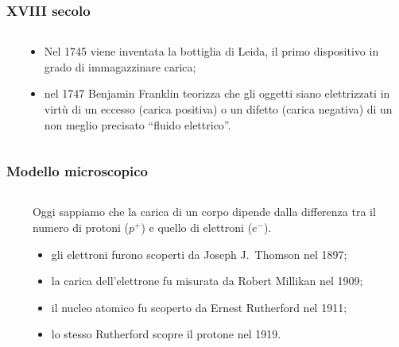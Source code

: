 \documentclass[]{beamer}
\theoremstyle{plain}
\begin{document}
\begin{frame}
\frametitle{XVIII secolo}
\begin{columns}
\begin{column}{0.2\textwidth}
~
\end{column}
\begin{column}{0.7\textwidth}
\begin{itemize}
\item<1-> Nel 1745 viene inventata la \alert<1>{bottiglia di Leida}, il primo dispositivo in grado di immagazzinare carica;\pause
\item<2-> nel 1747 Benjamin Franklin teorizza che gli oggetti siano elettrizzati in virtù di un eccesso (\alert<2>{carica positiva}) o un difetto (\alert<2>{carica negativa}) di un non meglio precisato ``fluido elettrico''.
\end{itemize}
\end{column}
\end{columns}
\end{frame}





\begin{frame}
\frametitle{Modello microscopico}
\begin{columns}
\begin{column}{0.2\textwidth}
~
~
\end{column}
\begin{column}{0.7\textwidth}
Oggi sappiamo che la \alert<1>{carica di un corpo dipende dalla differenza tra il numero di protoni ($ p^{+} $) e quello di elettroni ($ e^{-} $)}.
\begin{itemize}
\item<2-> gli elettroni furono scoperti da Joseph J.~\alert<2>{Thomson} nel \alert<2>{1897};
\item<3-> la carica dell'elettrone fu misurata da Robert \alert<3>{Millikan} nel \alert<3>{1909};
\item<4-> il nucleo atomico fu scoperto da Ernest \alert<4->{Rutherford} nel \alert<4>{1911};
\item<5-> lo stesso Rutherford scopre il protone nel \alert<5>{1919}.
\end{itemize}
\end{column}
\end{columns}
\end{frame}
\end{document}
